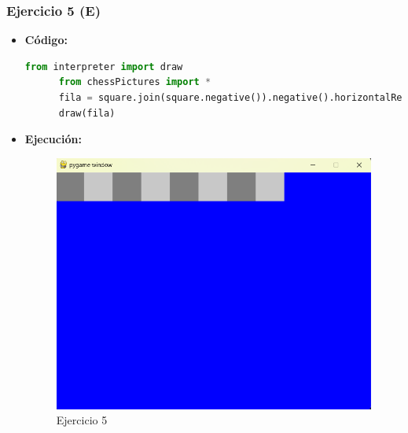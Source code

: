 \documentclass{article}
\begin{document}
  \subsubsection{Ejercicio 5 (E)}
  \begin{itemize}
    \item \textbf{Código:}
    \begin{lstlisting}[language=Python, caption=Ejercicio2e]
      from interpreter import draw
      from chessPictures import *
      fila = square.join(square.negative()).negative().horizontalRepeat(4)
      draw(fila)
    \end{lstlisting}
    \item \textbf{Ejecución:}  
    \begin{figure}[H]
      \centering
      \includegraphics[width=1\textwidth, keepaspectratio]{img/ejercicio2e.png}
      \caption{Ejercicio 5}
    \end{figure}
  \end{itemize}
  \newpage

\end{document}
